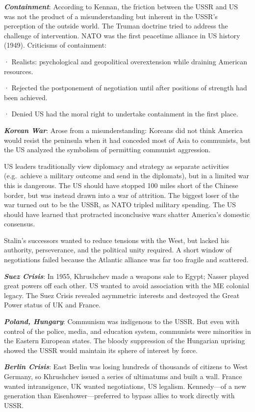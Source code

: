 \documentclass[
]{article}
\begin{document}
\textbf{\emph{Containment}}: According to Kennan, the friction between
the USSR and US was not the product of a misunderstanding but inherent
in the USSR's perception of the outside world. The Truman doctrine tried
to address the challenge of intervention. NATO was the first peacetime
alliance in US history (1949). Criticisms of containment:

· Realists: psychological and geopolitical overextension while draining
American resources.

· Rejected the postponement of negotiation until after positions of
strength had been achieved.

· Denied US had the moral right to undertake containment in the first
place.

\textbf{\emph{Korean War}}: Arose from a misunderstanding: Koreans did
not think America would resist the peninsula when it had conceded most
of Asia to communists, but the US analyzed the symbolism of permitting
communist aggression.

US leaders traditionally view diplomacy and strategy as separate
activities (e.g.~achieve a military outcome and send in the diplomats),
but in a limited war this is dangerous. The US should have stopped 100
miles short of the Chinese border, but was instead drawn into a war of
attrition. The biggest loser of the war turned out to be the USSR, as
NATO tripled military spending. The US should have learned that
protracted inconclusive wars shatter America's domestic consensus.

Stalin's successors wanted to reduce tensions with the West, but lacked
his authority, perseverance, and the political unity required. A short
window of negotiations failed because the Atlantic alliance was far too
fragile and scattered.

\textbf{\emph{Suez Crisis}}: In 1955, Khrushchev made a weapons sale to
Egypt; Nasser played great powers off each other. US wanted to avoid
association with the ME colonial legacy. The Suez Crisis revealed
asymmetric interests and destroyed the Great Power status of UK and
France.

\textbf{\emph{Poland, Hungary}}: Communism was indigenous to the USSR.
But even with control of the police, media, and education system,
communists were minorities in the Eastern European states. The bloody
suppression of the Hungarian uprising showed the USSR would maintain its
sphere of interest by force.

\textbf{\emph{Berlin Crisis}}: East Berlin was losing hundreds of
thousands of citizens to West Germany, so Khrushchev issued a series of
ultimatums and built a wall. France wanted intransigence, UK wanted
negotiations, US legalism. Kennedy---of a new generation than
Eisenhower---preferred to bypass allies to work directly with USSR.
\end{document}
